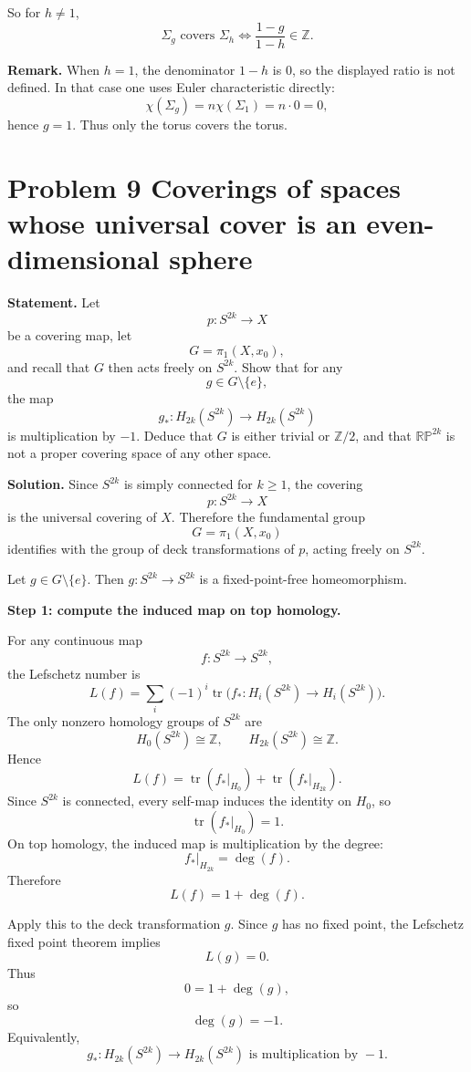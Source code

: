 \documentclass[12pt,a4paper]{article}
\theoremstyle{notespace}
\begin{document}
So for \(h\neq 1\),
\[
\boxed{\Sigma_g \text{ covers } \Sigma_h \iff \frac{1-g}{1-h}\in \mathbb Z.}
\]

\medskip

\textbf{Remark.}
When \(h=1\), the denominator \(1-h\) is \(0\), so the displayed ratio is not defined. In that case one uses Euler characteristic directly:
\[
\chi(\Sigma_g)=n\chi(\Sigma_1)=n\cdot 0=0,
\]
hence \(g=1\). Thus only the torus covers the torus.


\section{Problem 9 Coverings of spaces whose universal cover is an even-dimensional sphere}

\textbf{Statement.}
Let
\[
p:S^{2k}\to X
\]
be a covering map, let
\[
G=\pi_1(X,x_0),
\]
and recall that \(G\) then acts freely on \(S^{2k}\). Show that for any
\[
g\in G\setminus\{e\},
\]
the map
\[
g_*:H_{2k}(S^{2k})\to H_{2k}(S^{2k})
\]
is multiplication by \(-1\). Deduce that \(G\) is either trivial or \(\mathbb Z/2\), and that \(\mathbb{RP}^{2k}\) is not a proper covering space of any other space.

\bigskip

\textbf{Solution.}
Since \(S^{2k}\) is simply connected for \(k\ge 1\), the covering
\[
p:S^{2k}\to X
\]
is the universal covering of \(X\). Therefore the fundamental group
\[
G=\pi_1(X,x_0)
\]
identifies with the group of deck transformations of \(p\), acting freely on \(S^{2k}\).

Let \(g\in G\setminus\{e\}\). Then \(g:S^{2k}\to S^{2k}\) is a fixed-point-free homeomorphism.

\medskip

\textbf{Step 1: compute the induced map on top homology.}

For any continuous map
\[
f:S^{2k}\to S^{2k},
\]
the Lefschetz number is
\[
L(f)=\sum_i (-1)^i \operatorname{tr}\bigl(f_*:H_i(S^{2k})\to H_i(S^{2k})\bigr).
\]
The only nonzero homology groups of \(S^{2k}\) are
\[
H_0(S^{2k})\cong \mathbb Z,
\qquad
H_{2k}(S^{2k})\cong \mathbb Z.
\]
Hence
\[
L(f)=\operatorname{tr}(f_*|_{H_0})+\operatorname{tr}(f_*|_{H_{2k}}).
\]
Since \(S^{2k}\) is connected, every self-map induces the identity on \(H_0\), so
\[
\operatorname{tr}(f_*|_{H_0})=1.
\]
On top homology, the induced map is multiplication by the degree:
\[
f_*|_{H_{2k}}=\deg(f).
\]
Therefore
\[
L(f)=1+\deg(f).
\]

Apply this to the deck transformation \(g\). Since \(g\) has no fixed point, the Lefschetz fixed point theorem implies
\[
L(g)=0.
\]
Thus
\[
0=1+\deg(g),
\]
so
\[
\deg(g)=-1.
\]
Equivalently,
\[
\boxed{g_*:H_{2k}(S^{2k})\to H_{2k}(S^{2k}) \text{ is multiplication by } -1.}
\]
\end{document}
